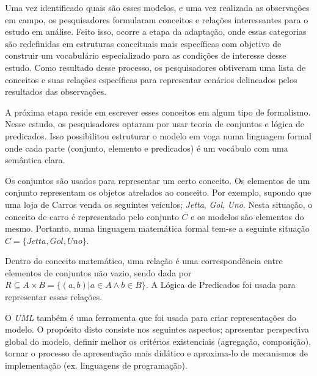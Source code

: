 Uma vez identificado quais são esses modelos, e uma vez realizada as observações em campo, os pesquisadores formularam conceitos e relações interessantes para o estudo em análise. Feito isso, ocorre a etapa da adaptação, onde essas categorias são redefinidas em estruturas conceituais mais específicas com objetivo de construir um vocabulário especializado para as condições de interesse desse estudo. Como resultado desse processo, os pesquisadores obtiveram uma lista de conceitos e suas relações específicas para representar cenários delineados pelos resultados das observações. 

A próxima etapa reside em escrever esses conceitos em algum tipo de formalismo. Nesse estudo, os pesquisadores optaram por usar teoria de conjuntos e lógica de predicados. Isso possibilitou estruturar o modelo em voga numa linguagem formal onde cada parte (conjunto, elemento e predicados) é um vocábulo com uma semântica clara. 

Os conjuntos são usados para representar um certo conceito. Os elementos de um conjunto representam os objetos atrelados ao conceito. Por exemplo, supondo que uma loja de Carros venda os seguintes veículos; \textit{Jetta}, \textit{Gol}, \textit{Uno}.
Nesta situação, o conceito de carro é representado pelo conjunto $C$ e os modelos são elementos do mesmo. Portanto, numa linguagem matemática formal tem-se a seguinte situação $C = \{Jetta,Gol,Uno\}$. 

Dentro do conceito matemático, uma relação é uma correspondência entre elementos de conjuntos não vazio, sendo dada por $R \subseteq  A \times B = \{(a,b)| a \in A \wedge b \in B \}$. A Lógica de Predicados foi usada para representar essas
relações.

O \textit{UML} também é uma ferramenta que foi usada para criar representações do modelo. O propósito disto consiste nos seguintes aspectos; apresentar perspectiva global do modelo, definir melhor os critérios existenciais (agregação, composição),
tornar o processo de apresentação mais didático e aproxima-lo de mecanismos de implementação (ex. linguagens de programação). 